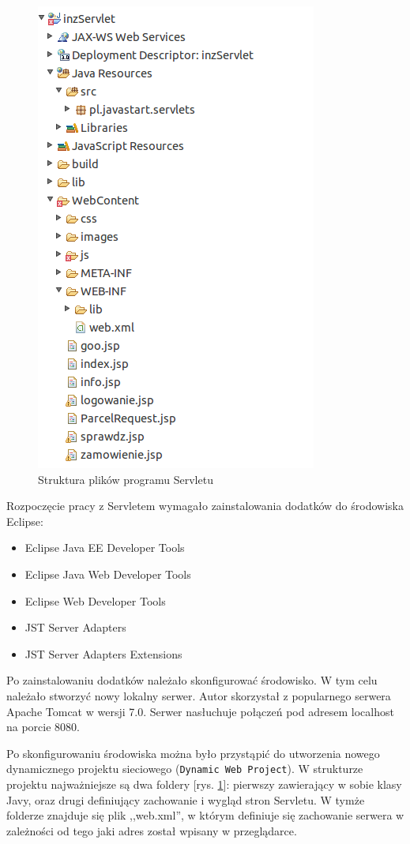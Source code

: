 \documentclass[eng,printmode,oneside]{mgr}
\begin{document}
\begin{figure}
\centering
\captionsetup{justification=centering,margin=0cm}
\vspace{-10pt}
\begin{centering}
\includegraphics[width=.45\textwidth]{strukturaServlet.png}
\end{centering}
  \caption{Struktura plików programu Servletu}
\label{fig:servlet}
\vspace{-60pt}
\end{figure}

Rozpoczęcie pracy z Servletem wymagało zainstalowania dodatków do środowiska
Eclipse:
\begin{itemize}
  \item Eclipse Java EE Developer Tools
  \item Eclipse Java Web Developer Tools
  \item Eclipse Web Developer Tools
  \item JST Server Adapters
  \item JST Server Adapters Extensions
\end{itemize}

Po zainstalowaniu dodatków należało skonfigurować środowisko. W tym celu
należało stworzyć nowy lokalny serwer. Autor skorzystał z popularnego serwera Apache
Tomcat w wersji 7.0. Serwer nasłuchuje połączeń pod adresem localhost na
porcie 8080.

Po skonfigurowaniu środowiska można było przystąpić do utworzenia nowego
dynamicznego projektu sieciowego (\texttt{Dynamic Web Project}). W strukturze
projektu najważniejsze są dwa foldery [rys. \ref{fig:servlet}]: pierwszy
zawierający w sobie klasy Javy, oraz drugi definiujący zachowanie i wygląd stron Servletu.
W tymże folderze znajduje się plik ,,web.xml'', w którym definiuje się
zachowanie serwera w zależności od tego jaki adres został wpisany w
przeglądarce.
\end{document}
